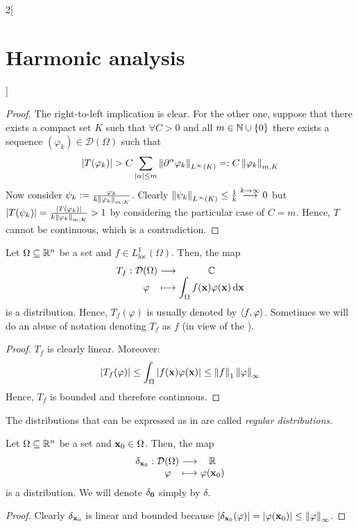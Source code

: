 \documentclass[../../../main_math.tex]{subfiles}
\begin{document}
\begin{multicols}{2}[\section{Harmonic analysis}]
  \begin{proof}
    The right-to-left implication is clear. For the other one, suppose that there exists a compact set $K$ such that $\forall C>0$ and all $m\in\mathbb{N}\cup\{0\}$ there exists a sequence $(\varphi_k)\in\mathcal{D}(\Omega)$ such that
    $$\abs{T(\varphi_k)}> C\sum_{\abs{\alpha}\leq m}\left\|\partial^\alpha\varphi_k\right\|_{L^\infty(K)}=:C\left\|\varphi_k\right\|_{m,K}$$
    Now consider $\psi_k:=\frac{\varphi_k}{k\left\|\varphi_k\right\|_{m,K}}$. Clearly $\left\|\psi_k\right\|_{L^\infty(K)}\leq\frac{1}{k}\overset{k\to\infty}{\longrightarrow}0$ but $\abs{T(\psi_k)}=\frac{\abs{T(\varphi_k)}}{k\left\|\varphi_k\right\|_{m,K}}>1$ by considering the particular case of $C=m$. Hence, $T$ cannot be continuous, which is a contradiction.
  \end{proof}
  \begin{proposition}
    Let $\Omega\subseteq \mathbb{R}^n$ be a set and $f\in L_{\mathrm{loc}}^1(\Omega)$. Then, the map
    \begin{equation}\label{HA:regularDistribution}
      \function{T_f}{\mathcal{D}(\Omega)}{\CC}{\varphi}{\displaystyle\int_\Omega f(\vf{x})\varphi(\vf{x})\dd{\vf{x}}}
    \end{equation}
    is a distribution. Hence, $T_f(\varphi)$ is usually denoted by ${\left\langle f,\varphi\right\rangle}$. Sometimes we will do an abuse of notation denoting $T_f$ as $f$ (in view of the ).
  \end{proposition}
  \begin{proof}
    $T_f$ is clearly linear. Moreover: $$\abs{T_f(\varphi)}\leq\int_\Omega\abs{f(\boldsymbol{\mathrm{x}})\varphi(\boldsymbol{\mathrm{x}})}\leq \left\|f\right\|_1\left\|\varphi\right\|_\infty$$
    Hence, $T_f$ is bounded and therefore continuous.
  \end{proof}
  \begin{definition}
    The distributions that can be expressed as in  are called \emph{regular distributions}.
  \end{definition}
  \begin{proposition}
    Let $\Omega\subseteq \mathbb{R}^n$ be a set and $\boldsymbol{\mathrm{x}}_0\in\Omega$. Then, the map
    $$
      \function{\delta_{\vf{x}_0}}{\mathcal{D}(\Omega)}{\RR}{\varphi}{\varphi(\vf{x}_0)}
    $$
    is a distribution. We will denote $\delta_{\boldsymbol{\mathrm{0}}}$ simply by $\delta$.
  \end{proposition}
  \begin{proof}
    Clearly $\delta_{\boldsymbol{\mathrm{x}}_0}$ is linear and bounded because $\abs{\delta_{\boldsymbol{\mathrm{x}}_0}(\varphi)}=\abs{\varphi(\boldsymbol{\mathrm{x}}_0)}\leq \left\|\varphi\right\|_\infty$.

\end{proof}
\end{multicols}
\end{document}
